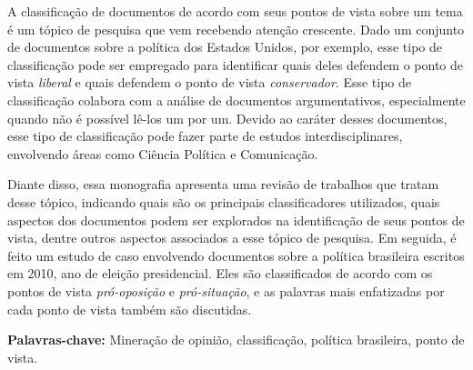 \documentclass[normaltoc,capchap,capsec,times]{abnt}
\begin{document}




\begin{resumo}
A classificação de documentos de acordo com seus pontos de vista sobre um tema é um tópico de pesquisa que vem recebendo atenção crescente. Dado um conjunto de documentos sobre a política dos Estados Unidos, por exemplo, esse tipo de classificação pode ser empregado 
para identificar quais deles defendem o ponto de vista \emph{liberal} e quais defendem o ponto de vista 
\emph{conservador}. Esse tipo de classificação colabora com a análise de documentos argumentativos, especialmente quando não é possível lê-los um por  um. Devido ao caráter desses documentos, esse tipo de classificação pode fazer parte de estudos interdisciplinares, envolvendo áreas como Ciência Política e Comunicação. 

Diante disso, essa monografia apresenta uma revisão de trabalhos que tratam desse tópico, indicando quais são os principais classificadores utilizados, quais aspectos dos documentos podem ser explorados na identificação de seus pontos de vista, dentre outros aspectos associados a esse tópico de pesquisa. Em seguida, é feito um estudo de caso envolvendo documentos sobre a política brasileira escritos em 2010, ano de eleição presidencial. Eles são classificados de acordo com os pontos de vista \emph{pró-oposição} e \emph{pró-situação}, e as palavras mais enfatizadas por cada ponto de vista também são discutidas. 






\textbf{Palavras-chave:}
Mineração de opinião,
classificação, 
política brasileira,
ponto de vista.
\end{resumo}
\end{document}

